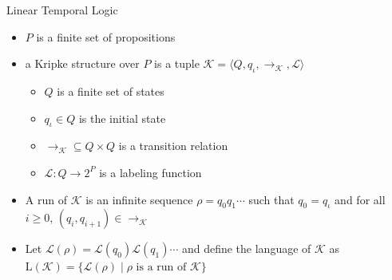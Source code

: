 \documentclass[12pt]{beamer}
\begin{document}
\begin{frame}{Linear Temporal Logic}
	\begin{itemize}
		\item $P$ is a finite set of propositions
		\item a Kripke structure over
$P$ is a tuple $\mathcal{K} = \langle Q, q_{\iota}, \rightarrow_{\mathcal{K}}, \mathcal{L} \rangle$
		\begin{itemize}
			\item $Q$ is a finite set of states	
			\item $q_{\iota} \in Q$ is the initial state
			\item $\rightarrow_{\mathcal{K}} \subseteq Q \times Q$ is a transition relation
			\item $\mathcal{L} : Q \to 2^{P}$ is a labeling function
		\end{itemize}
		\item A run of $\mathcal{K}$ is an infinite sequence $\rho = q_{0}q_{1}\cdots$ such that $q_{0} = q_{\iota}$ and for all $i \geq 0$, $(q_{i}, q_{i+1}) \in \rightarrow_{\mathcal{K}}$
		\item Let $\mathcal{L}(\rho) = \mathcal{L}(q_{0})\mathcal{L}(q_{1})\cdots$ and define the language of $\mathcal{K}$ as $\text{L}(\mathcal{K}) =
\{\mathcal{L}(\rho) \mid \rho \text{ is a run of } \mathcal{K}\}$
	\end{itemize}
\end{frame}
\end{document}

